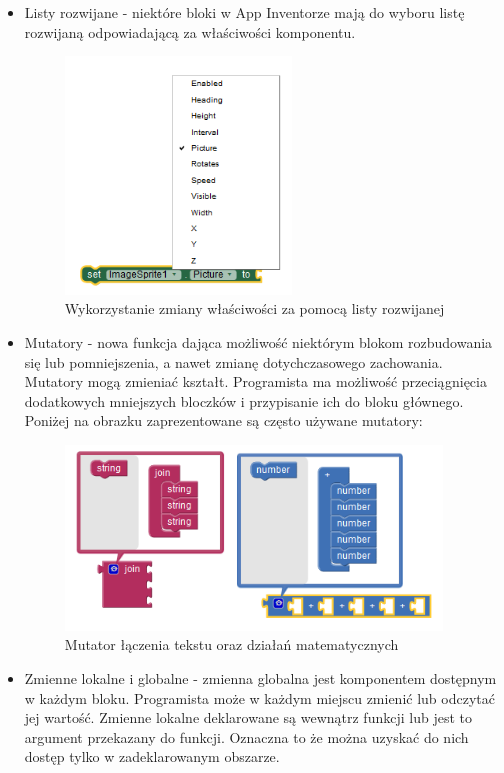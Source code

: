 \begin{itemize}
\item Listy rozwijane - niektóre bloki w App Inventorze mają do wyboru listę rozwijaną odpowiadającą za właściwości komponentu.\cite{android:44} 
\begin{figure}[H] 
\centering\includegraphics[width=6cm]{figures/dropdowns}
\caption{Wykorzystanie zmiany właściwości za pomocą listy rozwijanej}
\end{figure}

\item Mutatory - nowa funkcja dająca możliwość niektórym blokom rozbudowania się lub pomniejszenia, a nawet zmianę dotychczasowego zachowania. Mutatory mogą zmieniać kształt. Programista ma możliwość przeciągnięcia dodatkowych mniejszych bloczków i przypisanie ich do bloku głównego.\cite{android:45} Poniżej na obrazku zaprezentowane są często używane mutatory:

\begin{figure}[H] 
\centering\includegraphics[width=10cm]{figures/mutators}
\caption{Mutator łączenia tekstu oraz działań matematycznych}
\end{figure}

\item Zmienne lokalne i globalne - zmienna globalna jest komponentem dostępnym w każdym bloku. Programista może w każdym miejscu zmienić lub odczytać jej wartość. Zmienne lokalne deklarowane są wewnątrz funkcji lub jest to argument przekazany do funkcji. Oznaczna to że można uzyskać do nich dostęp tylko w zadeklarowanym obszarze.\cite{android:46}


\end{itemize}
